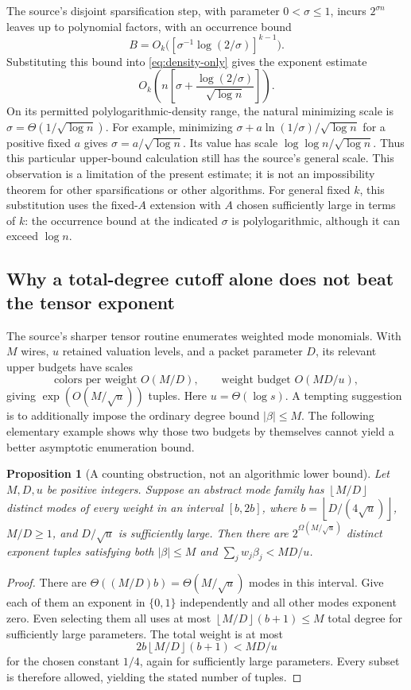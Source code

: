 \documentclass[11pt]{article}
\numberwithin{equation}{section}
\newtheorem{proposition}[theorem]{Proposition}
\theoremstyle{definition}\newtheorem{definition}[theorem]{Definition}
\theoremstyle{remark}\newtheorem{remark}[theorem]{Remark}
\newcommand{\floor}[1]{\left\lfloor#1\right\rfloor}
\begin{document}
The source's disjoint sparsification step, with parameter
$0<\sigma\le1$, incurs $2^{\sigma n}$ leaves up to polynomial
factors, with an occurrence bound
\[
 B=O_k\bigl([\sigma^{-1}\log(2/\sigma)]^{k-1}\bigr).
\]
Substituting this bound into \eqref{eq:density-only} gives the
exponent estimate
\begin{equation}\label{eq:sparsify-objective}
 O_k\!\left(n\left[
       \sigma+\frac{\log(2/\sigma)}{\sqrt{\log n}}
                    \right]\right).
\end{equation}
On its permitted polylogarithmic-density range, the natural minimizing
scale is $\sigma=\Theta(1/\sqrt{\log n})$. For example, minimizing
$\sigma+a\ln(1/\sigma)/\sqrt{\log n}$ for a positive fixed $a$
gives $\sigma=a/\sqrt{\log n}$. Its value has scale
$\log\log n/\sqrt{\log n}$. Thus this particular upper-bound
calculation still has the source's general scale. This observation
is a limitation of the present estimate; it is not an impossibility
theorem for other sparsifications or other algorithms.
For general fixed $k$, this substitution uses the fixed-$A$
extension with $A$ chosen sufficiently large in terms of $k$:
the occurrence bound at the indicated $\sigma$ is polylogarithmic,
although it can exceed $\log n$.

\subsection{Why a total-degree cutoff alone does not beat the tensor exponent}

The source's sharper tensor routine enumerates weighted mode
monomials. With $M$ wires, $u$ retained valuation levels, and a
packet parameter $D$, its relevant upper budgets have scales
\[
 \text{colors per weight }O(M/D),\qquad
 \text{weight budget }O(MD/u),
\]
giving $\exp(O(M/\sqrt u))$ tuples. Here $u=\Theta(\log s)$.
A tempting suggestion is to additionally impose the ordinary
degree bound $|\beta|\le M$. The following elementary example shows
why those two budgets by themselves cannot yield a better
asymptotic enumeration bound.

\begin{proposition}[A counting obstruction, not an algorithmic lower bound]
\label{prop:obstruction}
Let $M,D,u$ be positive integers. Suppose an abstract mode family
has $\floor{M/D}$ distinct modes
of every weight in an interval $[b,2b]$, where
$b=\floor{D/(4\sqrt u)}$, $M/D\ge1$, and $D/\sqrt u$ is
sufficiently large. Then there are $2^{\Omega(M/\sqrt u)}$
distinct exponent tuples satisfying both $|\beta|\le M$ and
$\sum_jw_j\beta_j<MD/u$.
\end{proposition}
\begin{proof}
There are $\Theta((M/D)b)=\Theta(M/\sqrt u)$ modes in this
interval. Give each of them an exponent in $\{0,1\}$ independently
and all other modes exponent zero. Even selecting them all uses at
most $\floor{M/D}(b+1)\le M$ total degree for sufficiently large
parameters. The total weight is at most
\[
 2b\floor{M/D}(b+1)<MD/u
\]
for the chosen constant $1/4$, again for sufficiently large
parameters. Every subset is therefore allowed, yielding the stated
number of tuples.
\end{proof}
\end{document}
